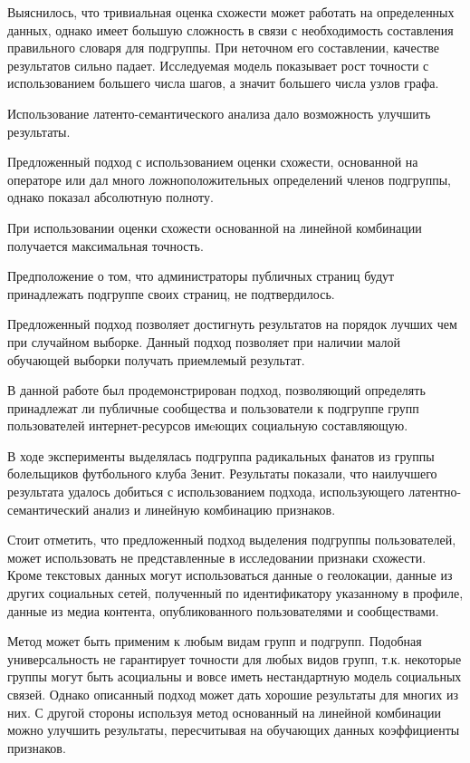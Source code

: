 \documentclass[annotation,times,page4]{itmo-student-thesis}
\begin{document}
Выяснилось, что тривиальная оценка схожести может работать на определенных данных, однако имеет большую сложность в связи с необходимость составления правильного словаря для подгруппы. При неточном его составлении, качестве результатов сильно падает. Исследуемая модель показывает рост точности с использованием большего числа шагов, а значит большего числа узлов графа. 

Использование латенто-семантического анализа дало возможность улучшить результаты.

Предложенный подход с использованием оценки схожести, основанной на операторе или дал много ложноположительных определений членов подгруппы, однако показал абсолютную полноту.

При использовании оценки схожести основанной на линейной комбинации получается максимальная точность.

Предположение о том, что администраторы публичных страниц будут принадлежать подгруппе своих страниц, не подтвердилось. 

Предложенный подход позволяет достигнуть результатов на порядок лучших чем при случайном выборке.  
 Данный подход позволяет при наличии малой обучающей выборки получать приемлемый результат.



\startconclusionpage

В данной работе был продемонстрирован подход, позволяющий определять принадлежат ли публичные сообщества и пользователи к подгруппе групп пользователей интернет-ресурсов имeющих социальную составляющую.

В ходе эксперименты выделялась подгруппа радикальных фанатов из группы болельщиков футбольного клуба Зенит. Результаты показали, что наилучшего результата удалось добиться с использованием подхода, использующего латентно-семантический анализ и линейную комбинацию признаков.

Стоит отметить, что предложенный подход выделения подгруппы пользователей, может использовать не представленные в исследовании признаки схожести. Кроме текстовых данных могут использоваться данные о геолокации, данные из других социальных сетей, полученный по идентификатору указанному в профиле, данные из медиа контента, опубликованного пользователями и сообществами. 

Метод может быть применим к любым видам групп и подгрупп. Подобная универсальность не гарантирует точности для любых видов групп, т.к. некоторые группы могут быть асоциальны и вовсе иметь нестандартную модель социальных связей. Однако описанный подход может дать хорошие результаты для многих из них. С другой стороны используя метод основанный на линейной комбинации можно улучшить результаты, пересчитывая на обучающих данных коэффициенты признаков. 
\end{document}
